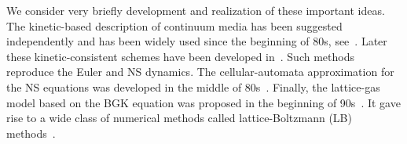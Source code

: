 \documentclass[]{elsarticle} %
\begin{document}
We consider very briefly development and realization of these important ideas.
The kinetic-based description of continuum media has been suggested independently and has been widely used since the beginning of 80s,
see~\cite{Potkin1975, Pullin1980, Reitz1981, Aristov1983}. Later these kinetic-consistent schemes have been developed
in~\cite{Elizarova1985, Deshpande1986, Prendergast1993, Chou1997, Ohwada2004Xu, Ohwada2004Kobayashi, Ohwada2006}.
Such methods reproduce the Euler and NS dynamics.
The cellular-automata approximation for the NS equations was developed in the middle of 80s~\cite{Frisch1986}.
Finally, the lattice-gas model based on the BGK equation was proposed in the beginning of 90s~\cite{Qian1992}.
It gave rise to a wide class of numerical methods called lattice-Boltzmann (LB) methods~\cite{Succi2001}.
\end{document}

